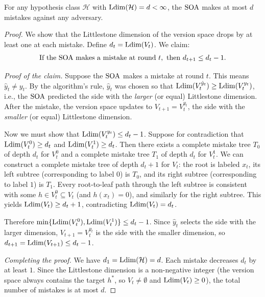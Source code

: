 \begin{thm}
\label{thm:soa-upper}
For any hypothesis class $\mathcal{H}$ with $\mathrm{Ldim}(\mathcal{H}) = d < \infty$, the $\mathrm{SOA}$ makes at most $d$ mistakes against any adversary.
\end{thm}

\begin{proof}
We show that the Littlestone dimension of the version space drops by at least one at each mistake. Define $d_t = \mathrm{Ldim}(V_t)$. We claim:
\begin{equation}
\label{eq:ldim-drop}
\text{If the $\mathrm{SOA}$ makes a mistake at round } t, \text{ then } d_{t+1} \leq d_t - 1.
\end{equation}%

\emph{Proof of the claim.} Suppose the $\mathrm{SOA}$ makes a mistake at round $t$. This means $\hat{y}_t \neq y_t$. By the algorithm's rule, $\hat{y}_t$ was chosen so that $\mathrm{Ldim}(V_t^{\hat{y}_t}) \geq \mathrm{Ldim}(V_t^{y_t})$, i.e., the $\mathrm{SOA}$ predicted the side with the \emph{larger} (or equal) Littlestone dimension. After the mistake, the version space updates to $V_{t+1} = V_t^{y_t}$, the side with the \emph{smaller} (or equal) Littlestone dimension.

Now we must show that $\mathrm{Ldim}(V_t^{y_t}) \leq d_t - 1$. Suppose for contradiction that $\mathrm{Ldim}(V_t^0) \geq d_t$ and $\mathrm{Ldim}(V_t^1) \geq d_t$. Then there exists a complete mistake tree $T_0$ of depth $d_t$ for $V_t^0$ and a complete mistake tree $T_1$ of depth $d_t$ for $V_t^1$. We can construct a complete mistake tree of depth $d_t + 1$ for $V_t$: the root is labeled $x_t$, its left subtree (corresponding to label $0$) is $T_0$, and its right subtree (corresponding to label $1$) is $T_1$. Every root-to-leaf path through the left subtree is consistent with some $h \in V_t^0 \subseteq V_t$ (and $h(x_t) = 0$), and similarly for the right subtree. This yields $\mathrm{Ldim}(V_t) \geq d_t + 1$, contradicting $\mathrm{Ldim}(V_t) = d_t$.

Therefore $\min\{\mathrm{Ldim}(V_t^0), \mathrm{Ldim}(V_t^1)\} \leq d_t - 1$. Since $\hat{y}_t$ selects the side with the larger dimension, $V_{t+1} = V_t^{y_t}$ is the side with the smaller dimension, so $d_{t+1} = \mathrm{Ldim}(V_{t+1}) \leq d_t - 1$.

\emph{Completing the proof.} We have $d_1 = \mathrm{Ldim}(\mathcal{H}) = d$. Each mistake decreases $d_t$ by at least $1$. Since the Littlestone dimension is a non-negative integer (the version space always contains the target $h^*$, so $V_t \neq \emptyset$ and $\mathrm{Ldim}(V_t) \geq 0$), the total number of mistakes is at most $d$.
\end{proof}

